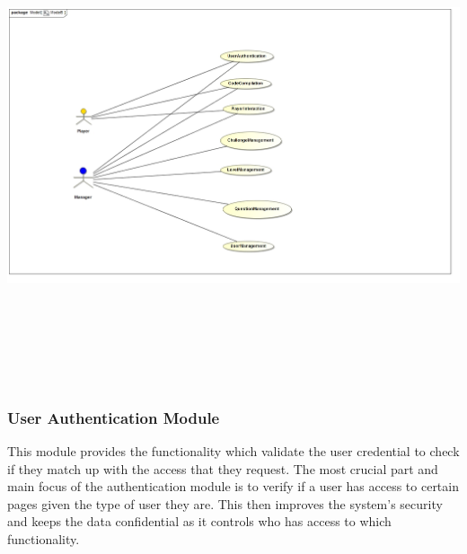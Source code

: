 \documentclass[english]{article}
\begin{document}
		\includegraphics[width=14cm,height=14cm,keepaspectratio]{ArcaneArcade.jpg}
		
		\subsubsection{User Authentication Module}
		This module provides the functionality which validate the user credential to check if they match up with the access that they request. The most crucial part and main focus of the authentication module is to verify if a user has access to certain pages given the type of user they are. This then improves the system's security and keeps the data confidential as it controls who has access to which functionality.
		
\end{document}
